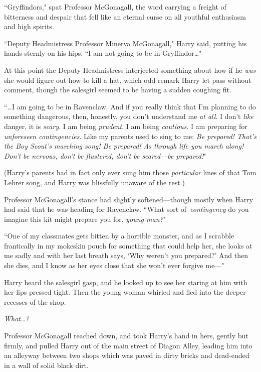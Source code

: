 ``Gryffindors," spat Professor McGonagall, the word carrying a freight of bitterness and despair that fell like an eternal curse on all youthful enthusiasm and high spirits.

``Deputy Headmistress Professor Minerva McGonagall," Harry said, putting his hands sternly on his hips. ``I am not going to be in Gryffindor…"

At this point the Deputy Headmistress interjected something about how if he \emph{was} she would figure out how to kill a hat, which odd remark Harry let pass without comment, though the salesgirl seemed to be having a sudden coughing fit.

``…I am going to be in Ravenclaw. And if you really think that I'm planning to do something dangerous, then, honestly, you don't understand me \emph{at all}. I don't \emph{like} danger, it is \emph{scary}. I am being \emph{prudent}. I am being \emph{cautious}. I am preparing for \emph{unforeseen contingencies}. Like my parents used to sing to me: \emph{Be prepared! That's the Boy Scout's marching song! Be prepared! As through life you march along! Don't be nervous, don't be flustered, don't be scared—be prepared!}"

(Harry's parents had in fact only ever sung him those \emph{particular} lines of that Tom Lehrer song, and Harry was blissfully unaware of the rest.)

Professor McGonagall's stance had slightly softened—though mostly when Harry had said that he was heading for Ravenclaw. ``What sort of\linebreak\ \emph{contingency} do you imagine this kit might prepare you for, \emph{young man?}"

``One of my classmates gets bitten by a horrible monster, and as I scrabble frantically in my mokeskin pouch for something that could help her, she looks at me sadly and with her last breath says, `Why weren't you prepared?' And then she dies, and I know as her eyes close that she won't ever forgive me—"

Harry heard the salesgirl gasp, and he looked up to see her staring at him with her lips pressed tight. Then the young woman whirled and fled into the deeper recesses of the shop.

\emph{What…?}

Professor McGonagall reached down, and took Harry's hand in hers, gently but firmly, and pulled Harry out of the main street of Diagon Alley, leading him into an alleyway between two shops which was paved in dirty bricks and dead-ended in a wall of solid black dirt.

